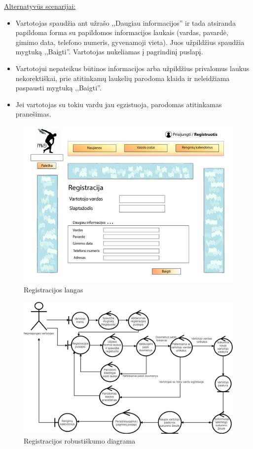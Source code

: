 \documentclass{VUMIFPSkursinis}
\begin{document}
\begin{enumerate} [label = \textbf{U\arabic*.}]
					\underline{Alternatyvūs scenarijai:}
					\begin{itemize}
						\item Vartotojas spaudžia ant užrašo ,,Daugiau informacijos'' ir tada atsiranda papildoma forma su papildomos informacijos laukais (vardas, pavardė, gimimo data, telefono numeris, gyvenamoji vieta). Juos užpildžius spaudžia mygtuką ,,Baigti''. Vartotojas nukeliamas į pagrindinį puslapį.
						\item Vartotojui nepateikus būtinos informacijos arba užpildžius privalomus laukus nekorektiškai, prie atitinkamų laukelių parodoma klaida ir neleidžiama paspausti mygtuką ,,Baigti''.
						\item Jei vartotojas su tokiu vardu jau egzistuoja, parodomas atitinkamas pranešimas.
					\end{itemize}

					\begin{figure}[H]
						\centering
						\includegraphics[width=\textwidth]{img/PSI4/registracija-01.jpg}
						\caption{Registracijos langas}
						\label{fig:uzd_registruotis}
					\end{figure}
					
					\begin{figure}[H]
					\centering
					\includegraphics[width=\textwidth]{img/PSI5/U6.png}
					\caption{Registracijos robustiškumo diagrama}
					\label{draw:u6}
				\end{figure}


\end{enumerate}
\end{document}
